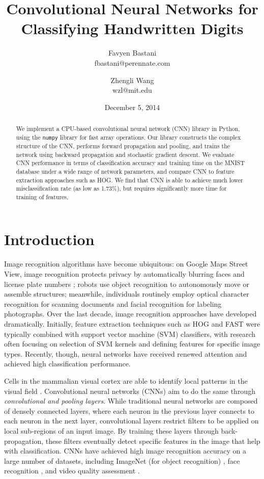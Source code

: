 \documentclass[10pt,twocolumn]{article}
\title{Convolutional Neural Networks for Classifying Handwritten Digits}
\date{December 5, 2014}
\author{
	Favyen Bastani \\
	fbastani@perennate.com
	\and
	Zhengli Wang \\
	wzl@mit.edu
}
\begin{document}
\maketitle

\begin{abstract}
We implement a CPU-based convolutional neural network (CNN) library in Python, using the \texttt{numpy} library for fast array operations. Our library constructs the complex structure of the CNN, performs forward propagation and pooling, and trains the network using backward propagation and stochastic gradient descent. We evaluate CNN performance in terms of classification accuracy and training time on the MNIST database under a wide range of network parameters, and compare CNN to feature extraction approaches such as HOG. We find that CNN is able to achieve much lower misclassification rate (as low as 1.73\%), but requires significantly more time for training of features.
\end{abstract}

\section{Introduction} \label{sec:introduction}

Image recognition algorithms have become ubiquitous: on Google Maps Street View, image recognition protects privacy by automatically blurring faces and license plate numbers \cite{streetview}; robots use object recognition to autonomously move or assemble structures; meanwhile, individuals routinely employ optical character recognition for scanning documents and facial recognition for labeling photographs. Over the last decade, image recognition approaches have developed dramatically. Initially, feature extraction techniques such as HOG and FAST were typically combined with support vector machine (SVM) classifiers, with research often focusing on selection of SVM kernels and defining features for specific image types. Recently, though, neural networks have received renewed attention and achieved high classification performance.

Cells in the mammalian visual cortex are able to identify local patterns in the visual field \cite{website:lenet}. Convolutional neural networks (CNNs) aim to do the same through \emph{convolutional and pooling layers}. While traditional neural networks are composed of densely connected layers, where each neuron in the previous layer connects to each neuron in the next layer, convolutional layers restrict filters to be applied on local sub-regions of an input image. By training these layers through back-propagation, these filters eventually detect specific features in the image that help with classification. CNNs have achieved high image recognition accuracy on a large number of datasets, including ImageNet (for object recognition) \cite{imagenet}, face recognition \cite{facerec}, and video quality assessment \cite{videoquality}.
\end{document}
